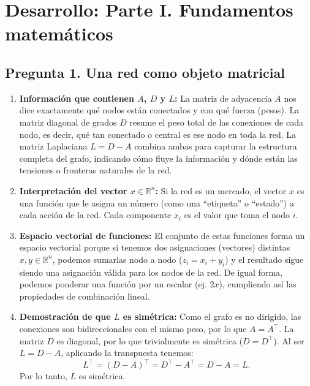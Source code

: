 \documentclass{article}
\begin{document}
	
	\section*{Desarrollo: Parte I. Fundamentos matemáticos}
	
	\subsection*{Pregunta 1. Una red como objeto matricial}
	\begin{enumerate}[label=\alph*)]
		\item \textbf{Información que contienen \(A\), \(D\) y \(L\):} La matriz de adyacencia \(A\) nos dice exactamente qué nodos están conectados y con qué fuerza (pesos). La matriz diagonal de grados \(D\) resume el peso total de las conexiones de cada nodo, es decir, qué tan conectado o central es ese nodo en toda la red. La matriz Laplaciana \(L = D - A\) combina ambas para capturar la estructura completa del grafo, indicando cómo fluye la información y dónde están las tensiones o fronteras naturales de la red.
		
		\item \textbf{Interpretación del vector \(x \in \mathbb{R}^n\):} Si la red es un mercado, el vector \(x\) es una función que le asigna un número (como una ``etiqueta'' o ``estado'') a cada acción de la red. Cada componente \(x_i\) es el valor que toma el nodo \(i\).
		
		\item \textbf{Espacio vectorial de funciones:} El conjunto de estas funciones forma un espacio vectorial porque si tenemos dos asignaciones (vectores) distintas \(x, y \in \mathbb{R}^n\), podemos sumarlas nodo a nodo (\(z_i = x_i + y_i\)) y el resultado sigue siendo una asignación válida para los nodos de la red. De igual forma, podemos ponderar una función por un escalar (ej. $2x$), cumpliendo así las propiedades de combinación lineal.
		
		\item \textbf{Demostración de que \(L\) es simétrica:} Como el grafo es no dirigido, las conexiones son bidireccionales con el mismo peso, por lo que \(A = A^\top\). La matriz \(D\) es diagonal, por lo que trivialmente es simétrica (\(D = D^\top\)). Al ser \(L = D - A\), aplicando la transpuesta tenemos:
		\[
		L^\top = (D - A)^\top = D^\top - A^\top = D - A = L.
		\]
		Por lo tanto, \(L\) es simétrica.
	\end{enumerate}
	
\end{document}

